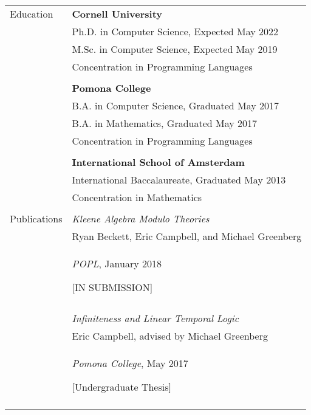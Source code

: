 \documentclass[letterpaper,11pt,oneside]{article}
\begin{document}
\noindent \begin{tabular}{@{} l l}
  \Large{Education} 

    & \textbf{Cornell University} \\

    & Ph.D. in Computer Science, Expected May 2022 \\

  
    & M.Sc. in Computer Science, Expected May 2019 \\
  

    & Concentration in Programming Languages \\
    & \\


    & \textbf{Pomona College} \\

    & B.A. in Computer Science, Graduated May 2017 \\

  
    & B.A. in Mathematics, Graduated May 2017 \\
  

    & Concentration in Programming Languages \\
    & \\


    & \textbf{International School of Amsterdam} \\

    & International Baccalaureate, Graduated May 2013 \\

    & Concentration in Mathematics \\
    & \\


  
  \Large{Publications} 
    & \textit{Kleene Algebra Modulo Theories} \\
    & Ryan Beckett, Eric Campbell, and Michael Greenberg \\
    & \textit{POPL}, January 2018

    \hfill [IN SUBMISSION]
 \\
    & \\

    & \textit{Infiniteness and Linear Temporal Logic} \\
    & Eric Campbell, advised by Michael Greenberg \\
    & \textit{Pomona College}, May 2017

    \hfill [Undergraduate Thesis]
 \\
    & \\


\end{tabular}
\end{document}
